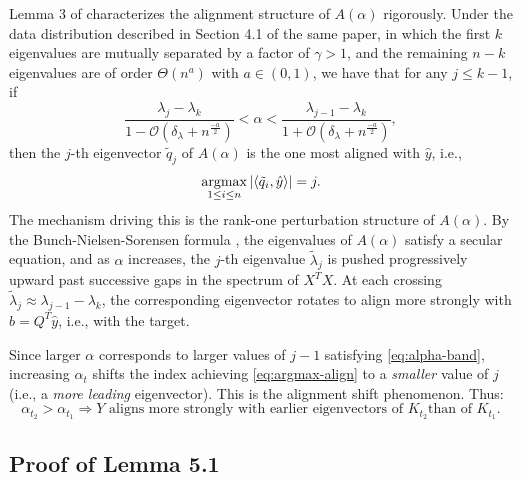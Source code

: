 \documentclass{article}
\begin{document}
Lemma 3 of \citep{ntk_eos} characterizes the alignment structure of $A(\alpha)$ rigorously. Under the data distribution described in Section 4.1 of the same paper, in which the first $k$ eigenvalues are mutually separated by a factor of $\gamma > 1$, and the remaining $n-k$ eigenvalues are of order $\Theta(n^a)$ with $a \in (0,1)$, we have that for any $j \leq k-1$, if
\begin{equation}
    \frac{\lambda_j - \lambda_k}{1 - \mathcal{O}(\delta_\lambda + n^{\frac{-a}{2}})}
    <
    \alpha
    <
    \frac{\lambda_{j-1} - \lambda_k}{1 + \mathcal{O}(\delta_\lambda + n^{\frac{-a}{2}})},
    \label{eq:alpha-band}
\end{equation}
then the $j$-th eigenvector $\tilde{q}_j$ of $A(\alpha)$ is the one most aligned with $\hat{y}$,
i.e.,
\begin{equation}
    \operatornamewithlimits{argmax}_{1 \leq i \leq n}
    |\langle \tilde{q}_i, \hat{y} \rangle|
    = j.
    \label{eq:argmax-align}
\end{equation}
The mechanism driving this is the rank-one perturbation structure of $A(\alpha)$. By the Bunch-Nielsen-Sorensen formula \citep{bunch}, the eigenvalues of $A(\alpha)$ satisfy a secular equation, and as $\alpha$ increases, the $j$-th eigenvalue $\tilde\lambda_j$ is pushed progressively upward past successive gaps in the spectrum of $X^T X$. At each crossing $\tilde\lambda_j \approx \lambda_{j-1} - \lambda_k$, the corresponding eigenvector rotates to align more strongly with $b = Q^T \hat{y}$, i.e., with the target.

Since larger $\alpha$ corresponds to larger values of $j-1$ satisfying \eqref{eq:alpha-band}, increasing $\alpha_t$ shifts the index achieving \eqref{eq:argmax-align} to a \emph{smaller} value of $j$ (i.e., a \emph{more leading} eigenvector). This is the alignment shift phenomenon.
Thus:
\begin{equation}
    \alpha_{t_2} > \alpha_{t_1}
    \Longrightarrow
    \text{$Y$ aligns more strongly with earlier eigenvectors of $K_{t_2}$
          than of $K_{t_1}$.}
    \label{eq:alignment-shift}
\end{equation}

\subsection{Proof of Lemma 5.1}
\end{document}
